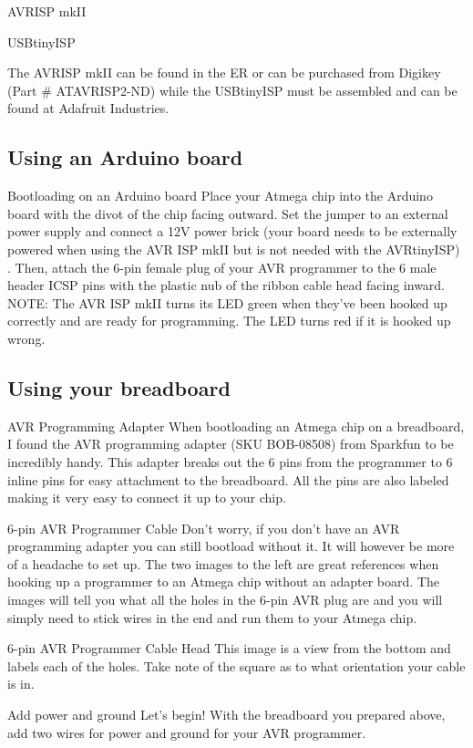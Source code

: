 AVRISP mkII

USBtinyISP

The AVRISP mkII can be found in the ER or can be purchased from Digikey (Part \# ATAVRISP2-ND) while the USBtinyISP must be assembled and can be found at Adafruit Industries.

\subsection{Using an Arduino board}


Bootloading on an Arduino board
Place your Atmega chip into the Arduino board with the divot of the chip facing outward. Set the jumper to an external power supply and connect a 12V power brick (your board needs to be externally powered when using the AVR ISP mkII but is not needed with the AVRtinyISP) . Then, attach the 6-pin female plug of your AVR programmer to the 6 male header ICSP pins with the plastic nub of the ribbon cable head facing inward.
NOTE: The AVR ISP mkII turns its LED green when they've been hooked up correctly and are ready for programming. The LED turns red if it is hooked up wrong.

\subsection{Using your breadboard}


AVR Programming Adapter
When bootloading an Atmega chip on a breadboard, I found the AVR programming adapter (SKU BOB-08508) from Sparkfun to be incredibly handy. This adapter breaks out the 6 pins from the programmer to 6 inline pins for easy attachment to the breadboard. All the pins are also labeled making it very easy to connect it up to your chip.


6-pin AVR Programmer Cable
Don't worry, if you don't have an AVR programming adapter you can still bootload without it. It will however be more of a headache to set up. The two images to the left are great references when hooking up a programmer to an Atmega chip without an adapter board. The images will tell you what all the holes in the 6-pin AVR plug are and you will simply need to stick wires in the end and run them to your Atmega chip.


6-pin AVR Programmer Cable Head
This image is a view from the bottom and labels each of the holes. Take note of the square as to what orientation your cable is in.


Add power and ground
Let's begin!
With the breadboard you prepared above, add two wires for power and ground for your AVR programmer.


